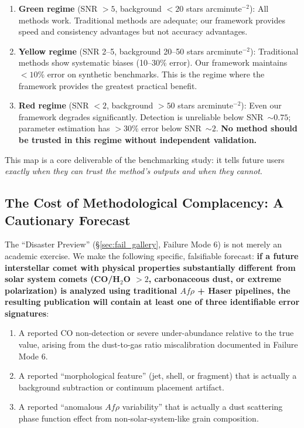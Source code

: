 \documentclass[usenatbib]{mnras}
\begin{document}
\begin{enumerate}
    \item \textbf{Green regime} (SNR $>5$, background $<20$ stars arcminute$^{-2}$): All methods work. Traditional methods are adequate; our framework provides speed and consistency advantages but not accuracy advantages.
    \item \textbf{Yellow regime} (SNR 2--5, background 20--50 stars arcminute$^{-2}$): Traditional methods show systematic biases (10--30\% error). Our framework maintains $<10\%$ error on synthetic benchmarks. This is the regime where the framework provides the greatest practical benefit.
    \item \textbf{Red regime} (SNR $<2$, background $>50$ stars arcminute$^{-2}$): Even our framework degrades significantly. Detection is unreliable below SNR~$\sim 0.75$; parameter estimation has $>30\%$ error below SNR~$\sim 2$. \textbf{No method should be trusted in this regime without independent validation.}
\end{enumerate}

This map is a core deliverable of the benchmarking study: it tells future users \textit{exactly when they can trust the method's outputs and when they cannot}.

\subsection{The Cost of Methodological Complacency: A Cautionary Forecast}

The ``Disaster Preview'' (\S\ref{sec:fail_gallery}, Failure Mode 6) is not merely an academic exercise. We make the following specific, falsifiable forecast: \textbf{if a future interstellar comet with physical properties substantially different from solar system comets (CO/H$_2$O $> 2$, carbonaceous dust, or extreme polarization) is analyzed using traditional $Af\rho$ + Haser pipelines, the resulting publication will contain at least one of three identifiable error signatures}:

\begin{enumerate}
    \item A reported CO non-detection or severe under-abundance relative to the true value, arising from the dust-to-gas ratio miscalibration documented in Failure Mode 6.
    \item A reported ``morphological feature'' (jet, shell, or fragment) that is actually a background subtraction or continuum placement artifact.
    \item A reported ``anomalous $Af\rho$ variability'' that is actually a dust scattering phase function effect from non-solar-system-like grain composition.
\end{enumerate}
\end{document}
